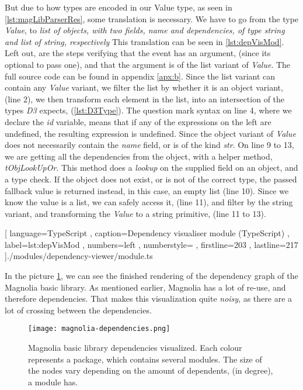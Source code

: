 But due to how types are encoded in our Value type, as seen in
\ref{lst:magLibParserRes}, some translation is necessary. We have to go from the
type \textit{Value}, to
\textit{
  list of objects, with two fields, name and dependencies, of type string and
  list of string, respectively}
This translation can be seen in \ref{lst:depVisMod}. Left out, are the steps
verifying that the event has an argument, (since its optional to pass one), and
that the argument is of the list variant of \textit{Value}. The full source code
can be found in appendix \ref{apx:b}. Since the list variant can contain any
\textit{Value} variant, we filter the list by whether it is an object variant,
(line 2), we then transform each element in the list, into an intersection of the
types \textit{D3} expects, (\ref{lst:D3Type}). The question mark syntax on line
4, where we declare the \textit{id} variable, means that if any of the
expressions on the left are undefined, the resulting expression is undefined.
Since the object variant of \textit{Value} does not necessarily contain the
\textit{name} field, or is of the kind \textit{str}. On line 9 to 13, we are
getting all the dependencies from the object, with a helper method,
\textit{tObjLookUpOr}. This method does a \textit{lookup} on the supplied field
on an object, and a type check. If the object does not exist, or is not of the
correct type, the passed fallback value is returned instead, in this case, an
empty list (line 10). Since we know the value is a list, we can safely access
it, (line 11), and filter by the string variant, and transforming the
\textit{Value} to a string primitive, (line 11 to 13).

\begin{code}[H]
  
    [ language=TypeScript
    , caption={Dependency visualiser module (TypeScript)}
    , label=lst:depVisMod
    , numbers=left
    , numberstyle=\tiny\color{gray}
    , firstline=203
    , lastline=217
    ]{./modules/dependency-viewer/module.ts}
\end{code}

In the picture \ref{pic:magLib}, we can see the finished rendering of the
dependency graph of the Magnolia basic library. As mentioned earlier, Magnolia
has a lot of re-use, and therefore dependencies. That makes this visualization
quite \textit{noisy}, as there are a lot of crossing between the dependencies.

\begin{figure}[H]
  \centering
  \texttt{[image: magnolia-dependencies.png]}
  \caption{
    Magnolia basic library dependencies visualized. Each colour represents a
    package, which contains several modules. The size of the nodes vary
    depending on the amount of dependents, (in degree), a module has.
  }
  \label{pic:magLib}
\end{figure}

